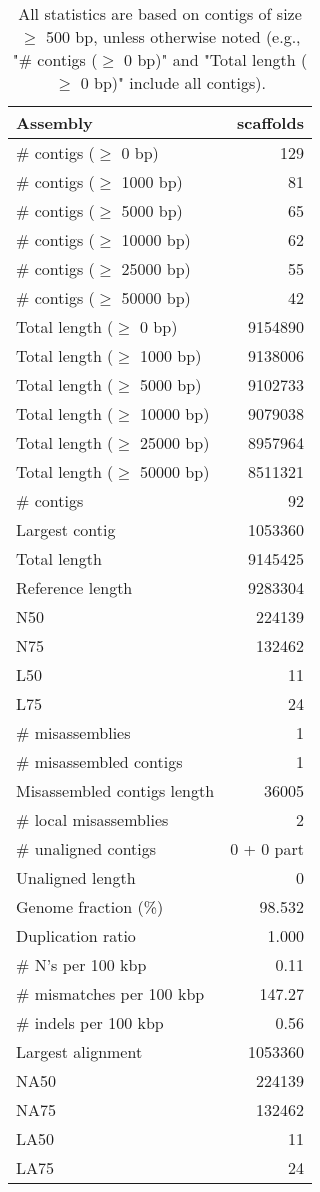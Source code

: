 \documentclass[12pt,a4paper]{article}
\begin{document}
\begin{table}[ht]
\begin{center}
\caption{All statistics are based on contigs of size $\geq$ 500 bp, unless otherwise noted (e.g., "\# contigs ($\geq$ 0 bp)" and "Total length ($\geq$ 0 bp)" include all contigs).}
\begin{tabular}{|l*{1}{|r}|}
\hline
Assembly & scaffolds \\ \hline
\# contigs ($\geq$ 0 bp) & 129 \\ \hline
\# contigs ($\geq$ 1000 bp) & 81 \\ \hline
\# contigs ($\geq$ 5000 bp) & 65 \\ \hline
\# contigs ($\geq$ 10000 bp) & 62 \\ \hline
\# contigs ($\geq$ 25000 bp) & 55 \\ \hline
\# contigs ($\geq$ 50000 bp) & 42 \\ \hline
Total length ($\geq$ 0 bp) & 9154890 \\ \hline
Total length ($\geq$ 1000 bp) & 9138006 \\ \hline
Total length ($\geq$ 5000 bp) & 9102733 \\ \hline
Total length ($\geq$ 10000 bp) & 9079038 \\ \hline
Total length ($\geq$ 25000 bp) & 8957964 \\ \hline
Total length ($\geq$ 50000 bp) & 8511321 \\ \hline
\# contigs & 92 \\ \hline
Largest contig & 1053360 \\ \hline
Total length & 9145425 \\ \hline
Reference length & 9283304 \\ \hline
N50 & 224139 \\ \hline
N75 & 132462 \\ \hline
L50 & 11 \\ \hline
L75 & 24 \\ \hline
\# misassemblies & 1 \\ \hline
\# misassembled contigs & 1 \\ \hline
Misassembled contigs length & 36005 \\ \hline
\# local misassemblies & 2 \\ \hline
\# unaligned contigs & 0 + 0 part \\ \hline
Unaligned length & 0 \\ \hline
Genome fraction (\%) & 98.532 \\ \hline
Duplication ratio & 1.000 \\ \hline
\# N's per 100 kbp & 0.11 \\ \hline
\# mismatches per 100 kbp & 147.27 \\ \hline
\# indels per 100 kbp & 0.56 \\ \hline
Largest alignment & 1053360 \\ \hline
NA50 & 224139 \\ \hline
NA75 & 132462 \\ \hline
LA50 & 11 \\ \hline
LA75 & 24 \\ \hline
\end{tabular}
\end{center}
\end{table}
\end{document}
